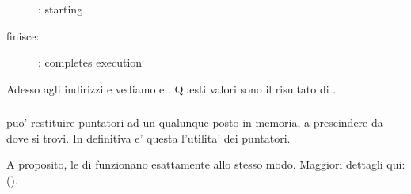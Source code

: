 \begin{figure}[H]
\centering
{}
\caption{\olly: \ttfone starting}
\label{fig:pointers_olly_stk_2}
\end{figure}

\clearpage
\ttfone finisce:

\begin{figure}[H]
\centering
{}
\caption{\olly: \ttfone completes execution}
\label{fig:pointers_olly_stk_3}
\end{figure}

Adesso agli indirizzi  e  vediamo  e .
Questi valori sono il risultato di \ttfone.

\subsubsection{\Conclusione{}}
 
\ttfone puo' restituire puntatori ad un qualunque posto in memoria, a prescindere da dove si trovi.
In definitiva e' questa l'utilita' dei puntatori.

A proposito, le  di \Cpp funzionano esattamente allo stesso modo.
Maggiori dettagli qui: ().
